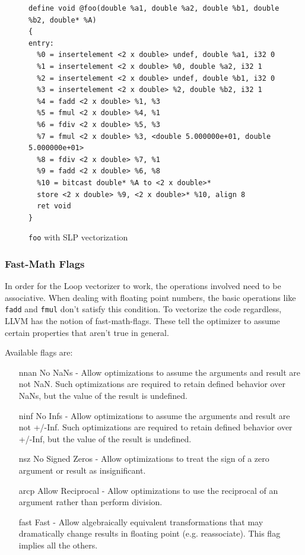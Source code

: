 \documentclass[a4paper,bibliography=totocnumbered,parskip,headsepline]{scrbook}
\begin{document}
\begin{figure}
\begin{lstlisting}
define void @foo(double %a1, double %a2, double %b1, double %b2, double* %A)
{
entry:
  %0 = insertelement <2 x double> undef, double %a1, i32 0
  %1 = insertelement <2 x double> %0, double %a2, i32 1
  %2 = insertelement <2 x double> undef, double %b1, i32 0
  %3 = insertelement <2 x double> %2, double %b2, i32 1
  %4 = fadd <2 x double> %1, %3
  %5 = fmul <2 x double> %4, %1
  %6 = fdiv <2 x double> %5, %3
  %7 = fmul <2 x double> %3, <double 5.000000e+01, double 5.000000e+01>
  %8 = fdiv <2 x double> %7, %1
  %9 = fadd <2 x double> %6, %8
  %10 = bitcast double* %A to <2 x double>*
  store <2 x double> %9, <2 x double>* %10, align 8
  ret void
}
\end{lstlisting}
\caption{\lstinline{foo} with SLP vectorization}
\label{fig:slpll2}
\end{figure}

\subsubsection{Fast-Math Flags}
In order for the Loop vectorizer to work, the operations involved need to be associative.
When dealing with floating point numbers, the basic operations like \lstinline{fadd} and \lstinline{fmul} don't satisfy this condition.
To vectorize the code regardless, LLVM has the notion of fast-math-flags.
These tell the optimizer to assume certain properties that aren't true in general.

Available flags are\cite{llvmref}:
\begin{itemize}
\item[nnan] No NaNs - Allow optimizations to assume the arguments and result are not NaN. Such optimizations are required to retain defined behavior over NaNs, but the value of the result is undefined.
\item[ninf] No Infs - Allow optimizations to assume the arguments and result are not +/-Inf. Such optimizations are required to retain defined behavior over +/-Inf, but the value of the result is undefined.
\item[nsz] No Signed Zeros - Allow optimizations to treat the sign of a zero argument or result as insignificant.
\item[arcp] Allow Reciprocal - Allow optimizations to use the reciprocal of an argument rather than perform division.
\item[fast] Fast - Allow algebraically equivalent transformations that may dramatically change results in floating point (e.g. reassociate). This flag implies all the others.
\end{itemize}
\end{document}
